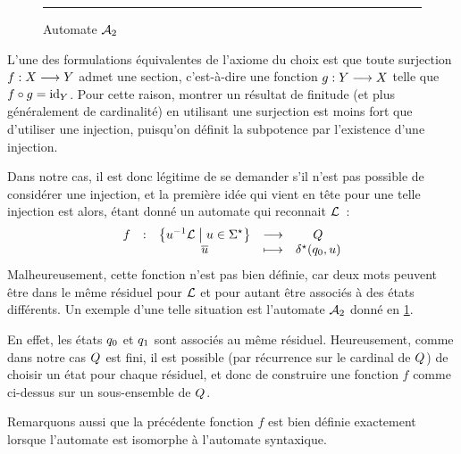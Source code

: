 \begin{figure}[t]
  \centering

  \vspace{0.2cm}
  \hrule

  \vspace{0.2cm}
  \caption{Automate $\mathcal{A}_2$}
  \label{fig.auto.2}
\end{figure}

\begin{remark}
  L'une des formulations équivalentes de l'axiome du choix est que toute
  surjection $f : \displaystyle X \longrightarrow Y$ admet une section, c'est-à-dire une
  fonction $g : \displaystyle Y \longrightarrow X$ telle que $f\circ g = \operatorname{id}_Y$. Pour cette
  raison, montrer un résultat de finitude (et plus généralement de cardinalité)
  en utilisant une surjection est moins fort que d'utiliser une injection,
  puisqu'on définit la subpotence par l'existence d'une injection.

  Dans notre cas, il est donc légitime de se demander s'il n'est pas possible
  de considérer une injection, et la première idée qui vient en tête pour une
  telle injection est alors, étant donné un automate qui reconnait
  $\mathcal L$~:
  \[\makeFun{f}{\compr{\luLq}{\varwd\in\toStA}}{\varQQ}
            {\clas{\varwd}}{\trAS(\varqZ,\varwd)}\]
  Malheureusement, cette fonction n'est pas bien définie, car deux mots peuvent
  être dans le même résiduel pour $\mathcal L$ et pour autant être associés à des
  états différents. Un exemple d'une telle situation est l'automate $\mathcal{A}_2$
  donné en \cref{fig.auto.2}.
  
  En effet, les états $q_{0}$ et $q_{1}$ sont associés au même résiduel.
  Heureusement, comme dans notre cas $Q_{}$ est fini, il est possible (par
  récurrence sur le cardinal de $Q_{}$) de choisir un état pour chaque
  résiduel, et donc de construire une fonction $f$ comme ci-dessus sur un
  sous-ensemble de $Q_{}$.

  Remarquons aussi que la précédente fonction $f$ est bien définie exactement
  lorsque l'automate est isomorphe à l'automate syntaxique.
\end{remark}

